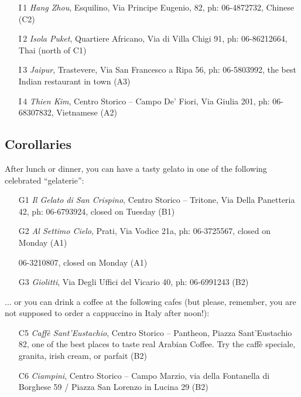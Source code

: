 \documentclass[twocolumn,10pt]{article}
\begin{document}
\begin{enumerate}

\item[I\,1] {\em Hang Zhou}, Esquilino, Via Principe Eugenio, 82, 
ph: 06-4872732, Chinese (C2)

\item[I\,2] {\em Isola Puket}, Quartiere Africano, Via di Villa Chigi 
91, ph: 06-86212664, Thai (north of C1)

\item[I\,3] {\em Jaipur}, Trastevere, Via San Francesco a Ripa 56, 
ph: 06-5803992, the best Indian restaurant in town (A3)


\item[I\,4] {\em Thien Kim}, Centro Storico -- Campo De' Fiori, Via 
Giulia 201, ph: 06-68307832, Vietnamese (A2)

\end{enumerate}


\subsection{Corollaries}
\label{se:corollaries}

\vspace{-2mm}

After lunch or dinner, you can have a tasty gelato in one of the 
following celebrated ``gelaterie'':

\begin{enumerate}

\item[G1] {\em Il Gelato di San Crispino}, Centro Storico -- Tritone, 
Via Della Panetteria 42, ph: 06-6793924, closed on Tuesday (B1)

\item[G2] {\em Al Settimo Cielo}, Prati, Via Vodice 21a, ph: 
06-3725567, closed on Monday (A1)

06-3210807, closed on Monday (A1)

\item[G3] {\em Giolitti}, Via Degli Uffici del Vicario 40, ph: 
06-6991243 (B2)

\end{enumerate}

\noindent ... or you can drink a coffee at the following cafes (but 
please, remember, you are not supposed to order a cappuccino in Italy 
after noon!):

\begin{enumerate}

\item[C5] {\em Caff\`e Sant'Eustachio}, Centro Storico -- Pantheon, 
Piazza Sant'Eustachio 82, one of the best places to taste real 
Arabian Coffee. Try the caff\`e speciale, granita, irish cream, or 
parfait  (B2)

\item[C6] {\em Ciampini}, Centro Storico -- Campo Marzio, via della 
Fontanella di Borghese 59 / Piazza San Lorenzo in Lucina 29  (B2)
\end{enumerate}
\end{document}
